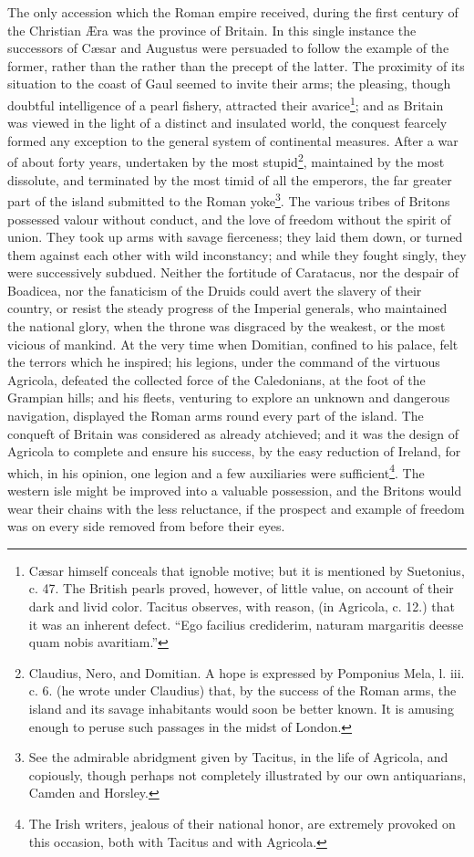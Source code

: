 The only accession which the Roman empire received, during the first century of the Christian Æra was the province of Britain.
In this single instance the successors of Cæsar and Augustus were persuaded to follow the example of the former, rather than the rather than the precept of the latter. The proximity of its situation to the coast of Gaul seemed to invite their arms; the pleasing, though doubtful intelligence of a pearl fishery, attracted their avarice\footnote{Cæsar himself conceals that ignoble motive; but it is mentioned by Suetonius, c. 47. The British pearls proved, however, of little value, on account of their dark and livid color. Tacitus observes, with reason, (in Agricola, c. 12.) that it was an inherent defect. \foreignlanguage{latin}{“Ego facilius crediderim, naturam margaritis deesse quam nobis avaritiam.”}}; and as Britain was viewed in the light of a distinct and insulated world, the conquest fearcely formed any exception to the general system of continental measures. After a war of about forty years, undertaken by the most stupid\footnote{Claudius, Nero, and Domitian. A hope is expressed by Pomponius Mela, l. iii. c. 6. (he wrote under Claudius) that, by the success of the Roman arms, the island and its savage inhabitants would soon be better known. It is amusing enough to peruse such passages in the midst of London.}, maintained by the most dissolute, and terminated by the most timid of all the emperors, the far greater part of the island submitted to the Roman yoke\footnote{See the admirable abridgment given by Tacitus, in the life of Agricola, and copiously, though perhaps not completely illustrated by our own antiquarians, Camden and Horsley.}. The various tribes of Britons possessed valour without conduct, and the love of freedom without the spirit of union. They took up arms with savage fierceness; they laid them down, or turned them against each other with wild inconstancy; and while they fought singly, they were successively subdued. Neither the fortitude of Caratacus, nor the despair of Boadicea, nor the fanaticism of the Druids could avert the slavery of their country, or resist the steady progress of the Imperial generals, who maintained the national glory, when the throne was disgraced by the weakest, or the most vicious of mankind. At the very time when Domitian, confined to his palace, felt the terrors which he inspired; his legions, under the command of the virtuous Agricola, defeated the collected force of the Caledonians, at the foot of the Grampian hills; and his fleets, venturing to explore an unknown and dangerous navigation, displayed the Roman arms round every part of the island. The conqueft of Britain was considered as already atchieved; and it was the design of Agricola to complete and ensure his success, by the easy reduction of Ireland, for which, in his opinion, one legion and a few auxiliaries were sufficient\footnote{The Irish writers, jealous of their national honor, are extremely provoked on this occasion, both with Tacitus and with Agricola.}. The western isle might be improved into a valuable possession, and the Britons would wear their chains with the less reluctance, if the prospect and example of freedom was on every side removed from before their eyes.

